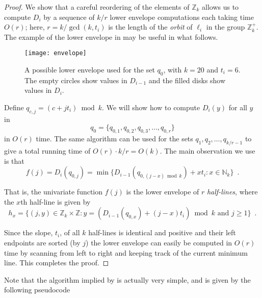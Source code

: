 \documentclass[11pt]{patmorin}
\newcommand{\Z}{\mathbb{Z}}
\newcommand{\N}{\mathbb{N}}
\newcommand{\defeq}{=}
\begin{document}
\begin{proof}
We show that a careful reordering of the elements of $\Z_k$ allows us
to compute $D_i$ by a sequence of $k/r$ lower envelope computations
each taking time $O(r)$; here, $r=k/\gcd(k,t_i)$ is the length of
the \emph{orbit} of $\ell_i$ in the group $\mathbb{Z}_k^+$.  The
example of 
the lower envelope in
 may be useful in what follows.

\begin{figure}
\begin{center}
\texttt{[image: envelope]}
\end{center}
\caption{A possible lower envelope used for the set $q_{0}$, with $k=20$
and $t_i=6$.   The empty circles show values in $D_{i-1}$ and
the filled disks show values in $D_i$.}
\end{figure}

Define $q_{c,j} = (c + jt_i)\bmod k$.  We will show how to compute
$D_{i}(y)$ for all $y$ in 
\[ 
    q_{0}=\{q_{0,1}, q_{0,2},q_{0,3},\ldots,q_{0,r}\}
\]
in $O(r)$ time.  The same algorithm can be used for the sets $q_{1},
q_{2}, \ldots, q_{k/r-1}$ to give a total running time of
$O(r)\cdot k/r= O(k)$.
The main observation we use is that
\begin{equation}
    f(j) \defeq D_{i}(q_{0,j}) = \min\{D_{i-1}(q_{0,(j-x)\bmod k})+xt_i :
x\in \N_k\} \enspace .
\end{equation}

That is, the univariate function $f(j)$ is the lower envelope of $r$
\emph{half-lines}, where the $x$th half-line is given by
\[
   h_x = \{(j,y)\in \Z_k\times \Z :
          \mbox{$y=(D_{i-1}(q_{0,x}) + (j-x)t_i)\bmod k$ 
               and $j\ge 1$}\} \enspace . 
\]

Since the slope, $t_i$, of all $k$ half-lines is identical and
positive and their left endpoints are sorted (by $j$) the lower
envelope can easily be computed in $O(r)$ time by scanning from left
to right and keeping track of the current minimum line.  This
completes the proof.  
\end{proof}

Note that the algorithm implied by  is actually very
simple, and is given by the following pseudocode

\begin{algorithmic}[1]
  \STATE{$\mu \gets \infty$}
  \ENDFOR
  \ENDFOR
\ENDFOR
\end{algorithmic}
\end{document}
